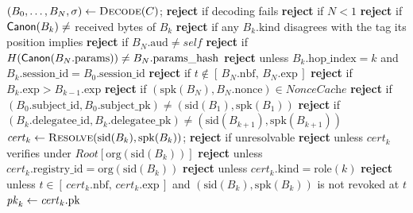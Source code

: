 \documentclass[11pt,a4paper]{article}
\begin{document}
\begin{algorithm}[!t]
\caption{DelegationChain verification, phases 1--5: structural,
temporal, and identity checks. Phases run cheapest-first; every
\textbf{reject} is terminal. Continued in \cref{alg:verify2}.}
\label{alg:verify}
\begin{algorithmic}[1]
  \State $(B_0,\ldots,B_N,\sigma) \gets \Call{Decode}{C}$;
         \textbf{reject} if decoding fails
  \State \textbf{reject} if $N < 1$
    \State \textbf{reject} if $\mathsf{Canon}(B_k) \neq$ received bytes of $B_k$
  \EndFor
  \State \textbf{reject} if any $B_k.\text{kind}$ disagrees with the tag
         its position implies
  \State \textbf{reject} if $B_N.\text{aud} \neq \mathit{self}$
  \State \textbf{reject} if $H(\mathsf{Canon}(B_N.\text{params})) \neq
         B_N.\text{params\_hash}$
    \State \textbf{reject} unless $B_k.\text{hop\_index} = k$ and
           $B_k.\text{session\_id} = B_0.\text{session\_id}$
  \EndFor
  \State \textbf{reject} if $t \notin [\,B_N.\text{nbf},\,
         B_N.\text{exp}\,]$
    \State \textbf{reject} if $B_k.\text{exp} > B_{k-1}.\text{exp}$
  \EndFor
  \State \textbf{reject} if $(\mathrm{spk}(B_N), B_N.\text{nonce}) \in
         \textit{NonceCache}$
  \State \textbf{reject} if $(B_0.\text{subject\_id}, B_0.\text{subject\_pk})
         \neq (\mathrm{sid}(B_1), \mathrm{spk}(B_1))$
    \State \textbf{reject} if $(B_k.\text{delegatee\_id},
           B_k.\text{delegatee\_pk}) \neq
           (\mathrm{sid}(B_{k+1}), \mathrm{spk}(B_{k+1}))$
  \EndFor
    \State $\mathit{cert}_k \gets
           \Call{Resolve}{\mathrm{sid}(B_k), \mathrm{spk}(B_k)}$;
           \textbf{reject} if unresolvable
    \State \textbf{reject} unless $\mathit{cert}_k$ verifies under
           $\mathit{Root}[\mathrm{org}(\mathrm{sid}(B_k))]$
    \State \textbf{reject} unless $\mathit{cert}_k.\text{registry\_id} =
           \mathrm{org}(\mathrm{sid}(B_k))$
    \State \textbf{reject} unless $\mathit{cert}_k.\text{kind} =
           \mathrm{role}(k)$
    \State \textbf{reject} unless $t \in [\,\mathit{cert}_k.\text{nbf},\,
           \mathit{cert}_k.\text{exp}\,]$ and
           $(\mathrm{sid}(B_k), \mathrm{spk}(B_k))$ is not revoked at $t$
    \State $\mathit{pk}_k \gets \mathit{cert}_k.\text{pk}$
  \EndFor
{}
\end{algorithmic}
\end{algorithm}
\end{document}
